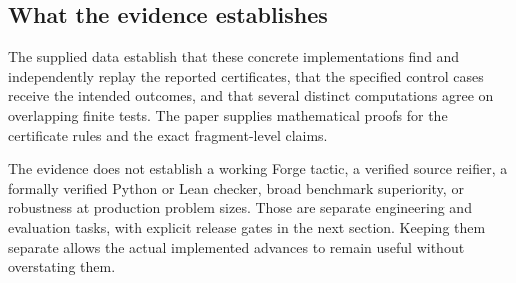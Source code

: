 \subsection{What the evidence establishes}
The supplied data establish that these concrete implementations find and independently replay the reported certificates, that the specified control cases receive the intended outcomes, and that several distinct computations agree on overlapping finite tests. The paper supplies mathematical proofs for the certificate rules and the exact fragment-level claims.

The evidence does not establish a working Forge tactic, a verified source reifier, a formally verified Python or Lean checker, broad benchmark superiority, or robustness at production problem sizes. Those are separate engineering and evaluation tasks, with explicit release gates in the next section. Keeping them separate allows the actual implemented advances to remain useful without overstating them.
